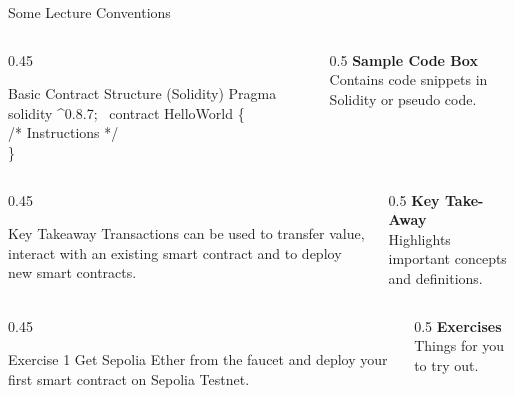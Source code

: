 \documentclass[handout]{beamer}
\begin{document}
\begin{frame}{Some Lecture Conventions}

	\begin{columns}[T]
		\begin{column}{0.45\textwidth}
			\vspace{-1em}
			\begin{samplecode}{Basic Contract Structure (Solidity)}
				Pragma solidity  \textasciicircum 0.8.7; \
				contract HelloWorld \{ \\
				\color{softanthracite} /* Instructions */ \\
				\color{black} \}
			\end{samplecode}			
		\end{column} %

		\begin{column}{0.5\textwidth}
			\textbf{Sample Code Box}\\
			Contains code snippets in Solidity or pseudo code.
		\end{column}
	\end{columns}

\vspace{2.5em}

	\begin{columns}[T]
		\begin{column}{0.45\textwidth}
			\vspace{-0.8em}
			\begin{keytakeaway}{Key Takeaway}
				Transactions can be used to transfer value, interact with an existing smart contract and to deploy new smart contracts.
			\end{keytakeaway}			
		\end{column}
		
		\begin{column}{0.5\textwidth}
			\textbf{Key Take-Away}\\
			Highlights important concepts and definitions.
		\end{column}
	\end{columns}

\vspace{2.5em}

	\begin{columns}[T]
		\begin{column}{0.45\textwidth}
			\vspace{-0.9em}
			\begin{exercise}{Exercise 1}
				Get Sepolia Ether from the faucet and deploy your first smart contract on Sepolia Testnet.
			\end{exercise}					
		\end{column}
		\begin{column}{0.5\textwidth}
		\textbf{Exercises}\\
			Things for you to try out.
		\end{column}
	\end{columns}

\end{frame}
\end{document}
